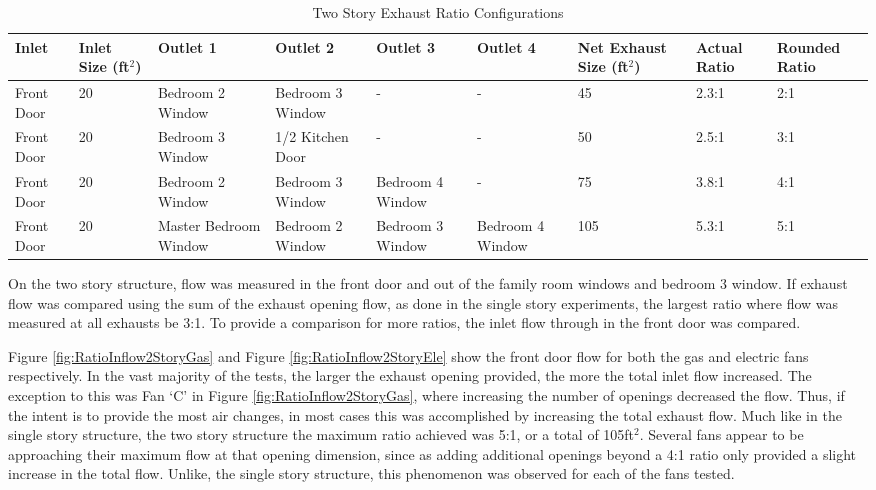 \documentclass{article}
\begin{document}
\begin{table}[H]
	\centering
	\caption {Two Story Exhaust Ratio Configurations}
	\begin{tabular}{|C{.45in}|C{.6in}|C{.7in}|C{.7in}|C{.7in}|C{.7in}|C{.6in}|C{.45in}|C{.5in}|}
		\hline
		Inlet & Inlet Size (ft$^2$) & Outlet 1 & Outlet 2 & Outlet 3 & Outlet 4 & Net Exhaust Size (ft$^2$) & Actual Ratio & Rounded Ratio \\ \hline \hline
		Front Door & 20 & Bedroom 2 Window & Bedroom 3 Window & - & - & 45 & 2.3:1 & 2:1 \\ \hline
		Front Door & 20 & Bedroom 3 Window & 1/2 Kitchen Door & - & - & 50 & 2.5:1 & 3:1 \\ \hline
		Front Door & 20 & Bedroom 2 Window & Bedroom 3 Window & Bedroom 4 Window & - & 75 & 3.8:1 & 4:1 \\ \hline
		Front Door & 20 & Master Bedroom Window & Bedroom 2 Window & Bedroom 3 Window & Bedroom 4 Window & 105 & 5.3:1 & 5:1 \\ \hline
	\end{tabular}
	\label{table:RatioExhaustComp_2Story}
\end{table}

On the two story structure, flow was measured in the front door and out of the family room windows and bedroom 3 window. If exhaust flow was compared using the sum of the exhaust opening flow, as done in the single story experiments, the largest ratio where flow was measured at all exhausts be 3:1. To provide a comparison for more ratios, the inlet flow through in the front door was compared. 

Figure \ref{fig:RatioInflow2StoryGas} and Figure \ref{fig:RatioInflow2StoryEle} show the front door flow for both the gas and electric fans respectively. In the vast majority of the tests, the larger the exhaust opening provided, the more the total inlet flow increased. The exception to this was Fan `C' in Figure \ref{fig:RatioInflow2StoryGas}, where increasing the number of openings decreased the flow. Thus, if the intent is to provide the most air changes, in most cases this was accomplished by increasing the total exhaust flow. Much like in the single story structure, the two story structure the maximum ratio achieved was 5:1, or a total of 105ft$^2$. Several fans appear to be approaching their maximum flow at that opening dimension, since as adding additional openings beyond a 4:1 ratio only provided a slight increase in the total flow. Unlike, the single story structure, this phenomenon was observed for each of the fans tested.  
\end{document}
